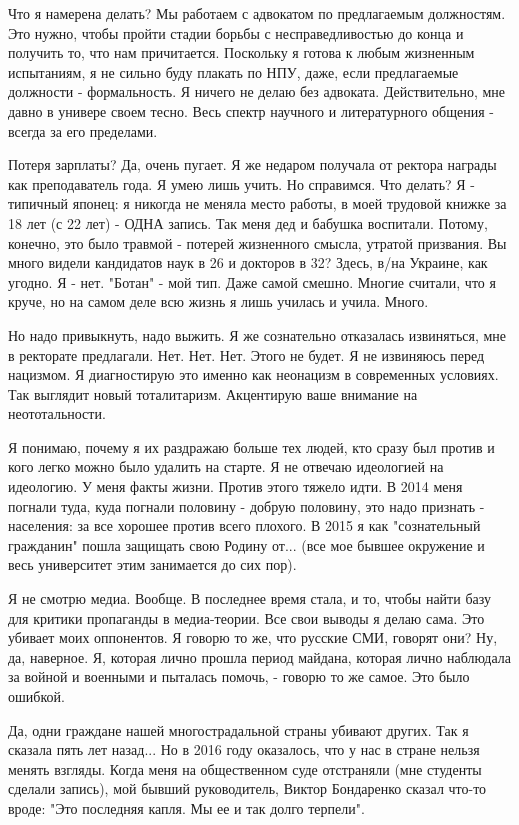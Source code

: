 Что я намерена делать? Мы работаем с адвокатом по предлагаемым должностям. Это
нужно, чтобы пройти стадии борьбы с несправедливостью до конца и получить то,
что нам причитается. Поскольку я готова к любым жизненным испытаниям, я не
сильно буду плакать по НПУ, даже, если предлагаемые должности - формальность. Я
ничего не делаю без адвоката. Действительно, мне давно в универе своем тесно.
Весь спектр научного и литературного общения - всегда за его пределами. 

Потеря зарплаты? Да, очень пугает. Я же недаром получала от ректора награды как
преподаватель года. Я умею лишь учить. Но справимся. Что делать? Я - типичный
японец: я никогда не меняла место работы, в моей трудовой книжке за 18 лет (с
22 лет) - ОДНА запись. Так меня дед и бабушка воспитали. Потому, конечно, это
было травмой - потерей жизненного смысла, утратой призвания. Вы много видели
кандидатов наук в 26 и докторов в 32? Здесь, в/на Украине, как угодно. Я - нет.
"Ботан" - мой тип. Даже самой смешно. Многие считали, что я круче, но на самом
деле всю жизнь я лишь училась и учила. Много. 

Но надо привыкнуть, надо выжить. Я же сознательно отказалась извиняться, мне в
ректорате предлагали. Нет. Нет. Нет. Этого не будет. Я не извиняюсь перед
нацизмом. Я диагностирую это именно как неонацизм в современных условиях. Так
выглядит новый тоталитаризм. Акцентирую ваше внимание на неототальности.

Я понимаю, почему я их раздражаю больше тех людей, кто сразу был против и кого
легко можно было удалить на старте. Я не отвечаю идеологией на идеологию. У
меня факты жизни. Против этого тяжело идти. В 2014 меня погнали туда, куда
погнали половину - добрую половину, это надо признать - населения: за все
хорошее против всего плохого. В 2015 я как "сознательный гражданин" пошла
защищать свою Родину от... (все мое бывшее окружение и весь университет этим
занимается до сих пор).

Я не смотрю медиа. Вообще. В последнее время стала, и то, чтобы найти базу для
критики пропаганды в медиа-теории. Все свои выводы я делаю сама. Это убивает
моих оппонентов. Я говорю то же, что русские СМИ, говорят они? Ну, да,
наверное. Я, которая лично прошла период майдана, которая лично наблюдала за
войной и военными и пыталась помочь, - говорю то же самое. Это было ошибкой.

Да, одни граждане нашей многострадальной страны убивают других. Так я сказала
пять лет назад... Но в 2016 году оказалось, что у нас в стране нельзя менять
взгляды. Когда меня на общественном суде отстраняли (мне студенты сделали
запись), мой бывший руководитель, Виктор Бондаренко сказал что-то вроде: "Это
последняя капля. Мы ее и так долго терпели". 

